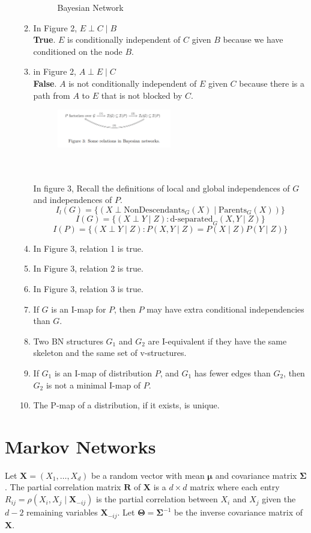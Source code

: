 \documentclass[a3paper,12pt]{extarticle} %
\begin{document}
\begin{enumerate}
\begin{enumerate}
\begin{figure}[h]
        \caption{Bayesian Network}
    \end{figure}
    \item In Figure 2, \(E \perp C \mid B\)
    \\ \textbf{True}. \(E\) is conditionally independent of \(C\) given \(B\) because we have conditioned on the node \(B\).
    \item in Figure 2, \(A \perp E \mid C\)
    \\ \textbf{False}. \(A\) is not conditionally independent of \(E\) given \(C\) because there is a path from \(A\) to \(E\) that is not blocked by \(C\).
    \begin{figure}[h]
        \centering
        \includegraphics[width=0.5\textwidth]{bn3.png}
    \end{figure}
    \\\\ In figure 3, 
Recall the definitions of local and global independences of \( G \) and independences of \( P \).
\[
I_l(G) = \{(X \perp \text{NonDescendants}_G(X) \mid \text{Parents}_G(X))\} \tag{1}
\]
\[
I(G) = \{(X \perp Y \mid Z) : \text{d-separated}_G(X, Y \mid Z)\} \tag{2}
\]
\[
I(P) = \{(X \perp Y \mid Z) : P(X, Y \mid Z) = P(X \mid Z)P(Y \mid Z)\} \tag{3}
\]
\item In Figure 3, relation 1 is true.
\item In Figure 3, relation 2 is true.
\item In Figure 3, relation 3 is true.
\item If \( G \) is an I-map for \( P \), then \( P \) may have extra conditional independencies than \( G \).
\item Two BN structures \( G_1 \) and \( G_2 \) are I-equivalent if they have the same skeleton and the same set of v-structures.
\item If \( G_1 \) is an I-map of distribution \( P \), and \( G_1 \) has fewer edges than \( G_2 \), then \( G_2 \) is not a minimal I-map of \( P \).
\item The P-map of a distribution, if it exists, is unique.
\end{enumerate}
\end{enumerate}
\newpage
\section{Markov Networks}
Let \( \mathbf{X} = (X_1, \ldots, X_d) \) be a random vector with mean \( \boldsymbol{\mu} \) and covariance matrix \( \boldsymbol{\Sigma} \). The partial correlation matrix \( \mathbf{R} \) of \( \mathbf{X} \) is a \( d \times d \) matrix where each entry \( R_{ij} = \rho(X_i, X_j \mid \mathbf{X}_{-ij}) \) is the partial correlation between \( X_i \) and \( X_j \) given the \( d-2 \) remaining variables \( \mathbf{X}_{-ij} \). Let \( \boldsymbol{\Theta} = \boldsymbol{\Sigma}^{-1} \) be the inverse covariance matrix of \( \mathbf{X} \).
\end{document}
